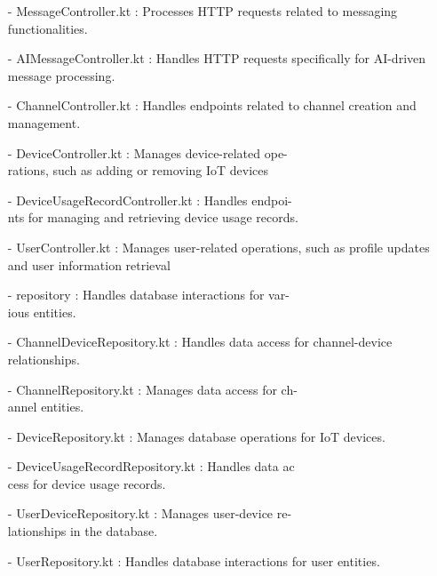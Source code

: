 \documentclass[conference]{IEEEtran}
\begin{document}
\begin{enumerate}
        \item[-] MessageController.kt : Processes HTTP requests related to messaging functionalities.\\
        
        \item[-] AIMessageController.kt : Handles HTTP requests specifically for AI-driven message processing.\\
        
        \item[-] ChannelController.kt : Handles endpoints related to channel creation and management.\\
        
        \item[-] DeviceController.kt : Manages device-related ope-\\rations, such as adding or removing IoT devices \\
        
        \item[-] DeviceUsageRecordController.kt : Handles endpoi-\\nts for managing and retrieving device usage records.\\
        
        \item[-] UserController.kt : Manages user-related operations, such as profile updates and user information retrieval\\

        \item[-] repository : Handles database interactions for var-\\ious entities.\\
        \item[-] ChannelDeviceRepository.kt : Handles data access for channel-device relationships.\\
        \item[-] ChannelRepository.kt : Manages data access for ch-\\annel entities.\\
        \item[-] DeviceRepository.kt : Manages database operations for IoT devices.\\
        \item[-] DeviceUsageRecordRepository.kt : Handles data ac\\cess for device usage records.\\
        \item[-] UserDeviceRepository.kt : Manages user-device re-\\lationships in the database.\\
        \item[-] UserRepository.kt : Handles database interactions for user entities.\\
        

\end{enumerate}
\end{document}
